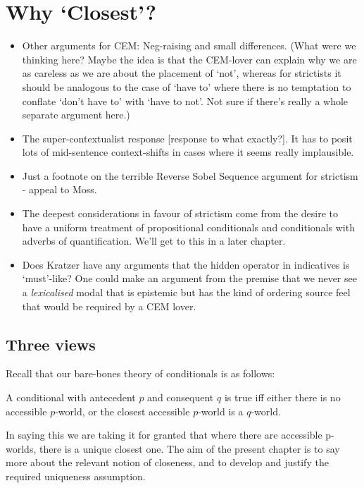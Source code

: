 \documentclass[If.tex]{subfiles}
\begin{document}
\chapter{Why ‘Closest’?}
\label{chap:cem}
\begin{itemize}
	\item
	Other arguments for CEM: Neg-raising and small differences.
	(What were we thinking here?  Maybe the idea is that the CEM-lover can explain why we are as careless as we are about the placement of ‘not’, whereas for strictists it should be analogous to the case of ‘have to’ where there is no temptation to conflate ‘don't have to’ with ‘have to not’.  Not sure if there's really a whole separate argument here.)
	\item
	The super-contextualist response [response to what exactly?]. It has to posit lots of mid-sentence context-shifts in cases where it seems really implausible.
	\item
	Just a footnote on the terrible Reverse Sobel Sequence argument for strictism - appeal to Moss.
	\item
	The deepest considerations in favour of strictism come from the desire to have a uniform treatment of propositional conditionals and conditionals with adverbs of quantification. We'll get to this in a later chapter.
	\item
	Does Kratzer have any arguments that the hidden operator in indicatives is ‘must’-like? One could make an argument from the premise that we never see a \emph{lexicalised} modal that is epistemic but has the kind of ordering source feel that would be required by a CEM lover.
\end{itemize}

\section{Three views}\label{why-closest}

Recall that our bare-bones theory of conditionals is as follows:
\begin{prop}
\litem[CLOSEST] \label{closest}
	A conditional with antecedent $p$ and consequent $q$ is true iff either there is no accessible $p$-world, or the closest accessible $p$-world is a $q$-world.
\end{prop}
In saying this we are taking it for granted that where there are accessible p-worlds, there is a unique closest one. The aim of the present chapter is to say more about the relevant notion of closeness, and to develop and justify the required uniqueness assumption.
\end{document}
